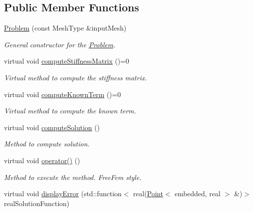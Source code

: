 \subsection*{\-Public \-Member \-Functions}
\begin{DoxyCompactItemize}
\item 
\hyperlink{class_problem_ae9308032115dd8b165d3047a263b6dcb}{\-Problem} (const \-Mesh\-Type \&input\-Mesh)
\begin{DoxyCompactList}\small\item\em \-General constructor for the \hyperlink{class_problem}{\-Problem}. \end{DoxyCompactList}\item 
\hypertarget{class_problem_a20ac3262ba227f49ff1e1b9765079d59}{virtual void \hyperlink{class_problem_a20ac3262ba227f49ff1e1b9765079d59}{compute\-Stiffness\-Matrix} ()=0}\label{class_problem_a20ac3262ba227f49ff1e1b9765079d59}

\begin{DoxyCompactList}\small\item\em \-Virtual method to compute the stiffness matrix. \end{DoxyCompactList}\item 
\hypertarget{class_problem_abb49b032c2cd29ed90a1966e3a7a8765}{virtual void \hyperlink{class_problem_abb49b032c2cd29ed90a1966e3a7a8765}{compute\-Known\-Term} ()=0}\label{class_problem_abb49b032c2cd29ed90a1966e3a7a8765}

\begin{DoxyCompactList}\small\item\em \-Virtual method to compute the known term. \end{DoxyCompactList}\item 
virtual void \hyperlink{class_problem_a0eabd7cfaf0b183da21f7246e50abbea}{compute\-Solution} ()
\begin{DoxyCompactList}\small\item\em \-Method to compute solution. \end{DoxyCompactList}\item 
\hypertarget{class_problem_a9fd9a722387afd56922d0327ead502bf}{virtual void \hyperlink{class_problem_a9fd9a722387afd56922d0327ead502bf}{operator()} ()}\label{class_problem_a9fd9a722387afd56922d0327ead502bf}

\begin{DoxyCompactList}\small\item\em \-Method to execute the method. \-Free\-Fem style. \end{DoxyCompactList}\item 
\hypertarget{class_problem_a26a9288abd12658a65b26f0a0e42fca5}{virtual void \hyperlink{class_problem_a26a9288abd12658a65b26f0a0e42fca5}{display\-Error} (std\-::function$<$ real(\hyperlink{class_point}{\-Point}$<$ embedded, real $>$ \&)$>$ real\-Solution\-Function)}\label{class_problem_a26a9288abd12658a65b26f0a0e42fca5}


\end{DoxyCompactItemize}
